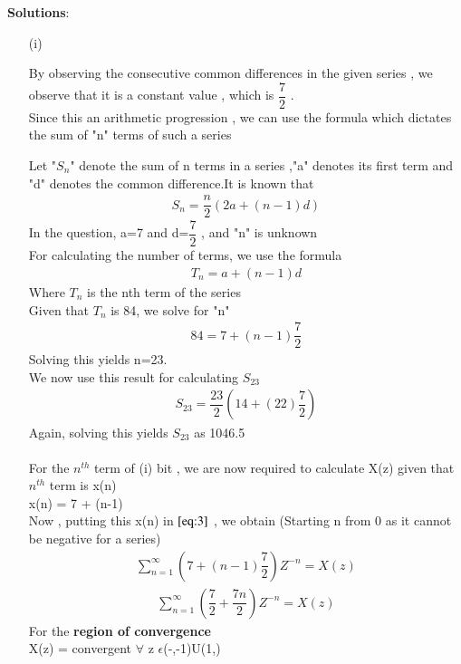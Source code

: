 \documentclass[journal,12pt,twocolumn]{IEEEtran}
\theoremstyle{remark}
\begin{document}
\vspace{0.5cm}
\textbf{Solutions}:
\begin{enumerate}
\item[(i)]   

By observing the consecutive common differences in the given series , we observe that it is a constant value , which is $\dfrac{7}{2}$ .\\
Since this an arithmetic progression , we can use the formula which dictates the sum of "n" terms of such a series

Let "$S_n$" denote the sum of n terms in a series ,"a" denotes its first term and "d" denotes the common difference.It is known that
\begin{align}
{S_n} = \dfrac{n}{2}(2a + (n-1)d)\label{eq:1}
\end{align}
In the question, a=7 and d=$\dfrac{7}{2}$ , and "n" is unknown\\
For calculating the number of terms, we use the formula
\begin{align}
{T_n} = a + (n-1)d\label{eq:2}
\end{align}
Where $T_n$ is the nth term of the series\\
Given that $T_n$ is 84, we solve for "n"
\begin{align}  
84 = 7+(n-1)\dfrac{7}{2}
\end{align}
Solving this yields n=23.\\
We now use this result for calculating $S_{23}$
\begin{align}
    S_{23} = \dfrac{23}{2}(14+(22)\dfrac{7}{2})
    \end{align}
Again, solving this yields $S_{23}$ as 1046.5\\\\
For the $n^{th}$ term of (i) bit , we are now required to calculate X(z) given that $n^{th}$ term is x(n)\\
x(n) = 7 + (n-1)\\

Now , putting this x(n) in $\eqref{eq:3}$ , we obtain (Starting n from 0 as it cannot be negative for a series)\\
\begin{align}
     \sum_{n=1}^{\infty}(7 + (n-1)\dfrac{7}{2})Z^{-n} =X(z)
\end{align}
\begin{align}
\sum_{n=1}^{\infty}(\dfrac{7}{2} + \dfrac{7n}{2})Z^{-n} =X(z)
\end{align}
For the \textbf{region of convergence}\\
X(z) = convergent $\forall$ z $\epsilon$(-\infty,-1)U(1,\infty)
\\


\end{enumerate}
\end{document}
